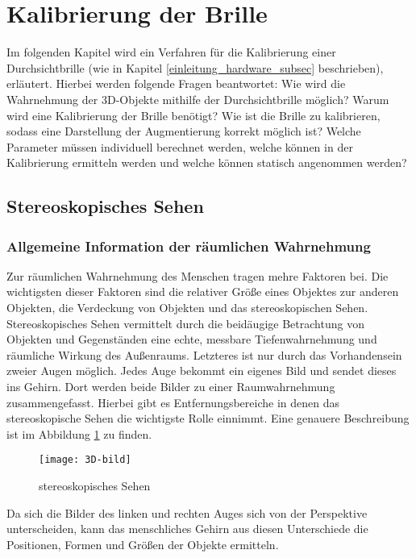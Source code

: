 \section{Kalibrierung der Brille}
Im folgenden Kapitel wird ein Verfahren für die Kalibrierung einer Durchsichtbrille (wie in Kapitel \ref{einleitung_hardware_subsec}  beschrieben), erläutert.
Hierbei werden folgende Fragen beantwortet: 
Wie wird die Wahrnehmung der 3D-Objekte mithilfe der Durchsichtbrille möglich?
Warum wird eine Kalibrierung der Brille benötigt? 
Wie ist die Brille zu kalibrieren, sodass eine Darstellung der Augmentierung korrekt möglich ist? 
Welche Parameter müssen individuell berechnet werden, welche können in der Kalibrierung ermitteln werden und welche können statisch angenommen werden?

\subsection{Stereoskopisches Sehen}
\label{sec:Stereoskopisches 3D}
\subsubsection{Allgemeine Information der räumlichen Wahrnehmung}
Zur räumlichen Wahrnehmung des Menschen tragen mehre Faktoren bei.
Die wichtigsten dieser Faktoren sind die relativer Größe eines Objektes zur anderen Objekten, die Verdeckung von Objekten und das stereoskopischen Sehen. 
Stereoskopisches Sehen vermittelt durch die beidäugige Betrachtung von Objekten und Gegenständen eine echte, messbare Tiefenwahrnehmung und räumliche Wirkung des Außenraums. 
Letzteres ist nur durch das Vorhandensein zweier Augen möglich.
Jedes Auge bekommt ein eigenes Bild und sendet dieses ins Gehirn.
Dort werden beide Bilder zu einer Raumwahrnehmung zusammengefasst.
Hierbei gibt es Entfernungsbereiche in denen das stereoskopische Sehen die wichtigste Rolle einnimmt.
Eine genauere Beschreibung ist im Abbildung \ref{fig:3D} \cite{stereo} zu finden.

\begin{figure}[h]
   \centering
   \texttt{[image: 3D-bild]}
   \caption{stereoskopisches Sehen}
   \label{fig:3D}
\end{figure}

Da sich die Bilder des linken und rechten Auges sich von der Perspektive unterscheiden, kann das menschliches Gehirn aus diesen Unterschiede die Positionen, Formen und Größen der Objekte ermitteln.

